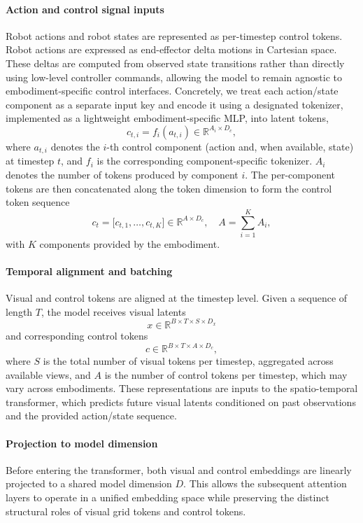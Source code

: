 \paragraph{Action and control signal inputs}
Robot actions and robot states are represented as per-timestep control tokens. Robot actions are expressed as end-effector delta motions in Cartesian space. These deltas are computed from observed state transitions rather than directly using low-level controller commands, allowing the model to remain agnostic to embodiment-specific control interfaces. Concretely, we treat each action/state component as a separate input key and encode it using a designated tokenizer, implemented as a lightweight embodiment-specific MLP, into latent tokens,
\[
c_{t,i} = f_i(a_{t,i}) \in \mathbb{R}^{A_i \times D_c},
\]
where $a_{t,i}$ denotes the $i$-th control component (action and, when available, state) at timestep $t$, and $f_i$ is the corresponding component-specific tokenizer. $A_i$ denotes the number of tokens produced by component $i$. The per-component tokens are then concatenated along the token dimension to form the control token sequence
\[
c_t = \big[ c_{t,1}, \ldots, c_{t,K} \big] \in \mathbb{R}^{A \times D_c}, \quad A=\sum_{i=1}^{K} A_i,
\]
with $K$ components provided by the embodiment.

\paragraph{Temporal alignment and batching}
Visual and control tokens are aligned at the timestep level. Given a sequence of length $T$, the model receives visual latents
\[
x \in \mathbb{R}^{B \times T \times S \times D_x}
\]
and corresponding control tokens
\[
c \in \mathbb{R}^{B \times T \times A \times D_c},
\]
where $S$ is the total number of visual tokens per timestep, aggregated across available views, and $A$ is the number of control tokens per timestep, which may vary across embodiments. These representations are inputs to the spatio-temporal transformer, which predicts future visual latents conditioned on past observations and the provided action/state sequence.


\paragraph{Projection to model dimension}
Before entering the transformer, both visual and control embeddings are linearly projected to a shared model dimension $D$. This allows the subsequent attention layers to operate in a unified embedding space while preserving the distinct structural roles of visual grid tokens and control tokens.


